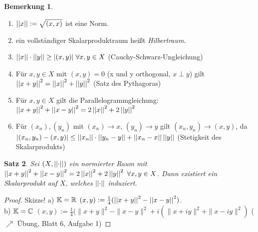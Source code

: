 \documentclass[ngerman]{report}
\theoremstyle{plain}%
\newtheorem{thm}{Satz}[chapter]
\theoremstyle{definition}%
\theoremstyle{myStyle}
\newtheorem{bem}[thm]{Bemerkung}
\begin{document}
	\begin{bem}
		\begin{enumerate}[1)]
			\item $\norm{x} := \sqrt{(x,x)}$ ist eine Norm.
			\item ein vollständiger Skalarproduktraum heißt \textit{Hilbertraum}.
			\item $\norm{x} \cdot \norm{y} \geq |(x,y)| \; \forall x,y \in X$ (Cauchy-Schwarz-Ungleichung)

			\item Für $x,y \in X$ mit $(x,y) = 0$ (x und y orthogonal, $x \perp y$)
			gilt $\norm{x + y}^2 = \norm{x}^2 + \norm{y}^2$ (Satz des Pythagoras)
			\item Für $x,y \in X$ gilt die Parallelogrammgleichung: 
				$\norm{x + y} ^2 + \norm{x - y}^2 = 2 \norm{x}^2 + 2\norm{y}^2$
			\item	Für $(x_n), (y_n)$ mit $(x_n) \to x$, $(y_n) \to y$ gilt 
				$(x_n, y_n) \to (x,y)$, da\\ 
				$|(x_n, y_n) - (x,y)| \leq \norm{x_n}\cdot \norm{y_n - y} + \norm{x_n - x}\norm{y}$ (Stetigkeit des Skalarprodukts)
		\end{enumerate}
	\end{bem}
	\begin{thm}
	Sei $(X,\norm{\cdot})$ ein normierter Raum mit $\norm{x+y}^2 + \norm{x-y}^2 = 2\norm{x}^2 +2\norm{y}^2 ~\forall x,y \in X$. Dann existiert ein Skalarprodukt auf $X$, welches $\norm{\cdot}$ induziert.
	\end{thm}
	\begin{proof}
		Skizze! a) $\K = \R$ $(x,y) := \frac{1}{4}(\norm{x + y}^2 - \norm{x-y}^2)$.\\ b) $\K = \C$ $(x,y) := \frac{1}{4}(\| x+y\|^2 - \|x-y\|^2 + i(\|x+iy\|^2 + \|x-iy\|^2)$ ($\nearrow$ Übung, Blatt 6, Aufgabe 1)
	\end{proof}
\end{document}
